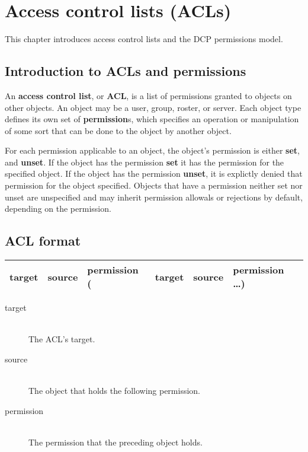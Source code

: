 \chapter{Access control lists (ACLs)}
\label{chap:acls}

This chapter introduces access control lists and the DCP permissions model.

\newpage



\section{Introduction to ACLs and permissions}
\sectionrule

An \textbf{access control list}, or \textbf{ACL}, is a list of permissions
granted to objects on other objects.  An object may be a user, group, roster, or
server.  Each object type defines its own set of \textbf{permission}s, which
specifies an operation or manipulation of some sort that can be done to the
object by another object.

For each permission applicable to an object, the object's permission is either
\textbf{set}, and \textbf{unset}.  If the object has the permission \textbf{set}
it has the permission for the specified object.  If the object has the
permission \textbf{unset}, it is explictly denied that permission for the object
specified.  Objects that have a permission neither set nor unset are unspecified
and may inherit permission allowals or rejections by default, depending on the
permission.



\section{ACL format}
\sectionrule
\label{acl:format}

\begin{tabular}{|l|l|l|l|l|l|}
  \hline
  target & source & permission ( & target & source & permission \ldots ) \\
  \hline
\end{tabular}

\begin{description}
  \item[target] \hfill \\
  The ACL's target.
  
  \item[source] \hfill \\
  The object that holds the following permission.
  
  \item[permission] \hfill \\
  The permission that the preceding object holds.
\end{description}



